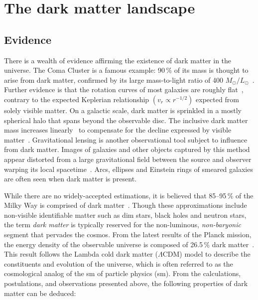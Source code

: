 \section{The dark matter landscape}
\label{sec:theory_dm_landscape}

\subsection{Evidence}
\label{subsec:theory_dm_evidence}

There is a wealth of evidence affirming the existence of dark matter in the universe. The Coma Cluster is a famous example: 90\,\% of its mass is thought to arise from dark matter, confirmed by its large mass-to-light ratio of 400 $M_{\odot} / L_{\odot}$~\cite{Yozin:2015mla}. Further evidence is that the rotation curves of most galaxies are roughly flat~\cite{1996MNRAS-281-27P}, contrary to the expected Keplerian relationship $(v_r \propto r^{-1/2})$ expected from solely visible matter. On a galactic scale, dark matter is sprinkled in a mostly spherical halo that spans beyond the observable disc. The inclusive dark matter mass increases linearly~\cite{2009arXiv0901.0632E} to compensate for the decline expressed by visible matter~\cite{1970ApJ-160-811F,1992AandA-256-19B}. Gravitational lensing is another observational tool subject to influence from dark matter. Images of galaxies and other objects captured by this method appear distorted from a large gravitational field between the source and observer warping its local spacetime~\cite{2010GReGr..42.2177H}. Arcs, ellipses and Einstein rings of smeared galaxies are often seen when dark matter is present.

While there are no widely-accepted estimations, it is believed that 85--95\,\% of the Milky Way is comprised of dark matter~\cite{2005MNRAS.364..433B,2006MNRAS.370.1055B,Kafle:2014xfa}. Though these approximations include non-visible identifiable matter such as dim stars, black holes and neutron stars, the term \emph{dark matter} is typically reserved for the non-luminous, \emph{non-baryonic} segment that pervades the cosmos. From the latest results of the Planck mission, the energy density of the observable universe is composed of 26.5\,\% dark matter~\cite{Aghanim:2018eyx}. This result follows the Lambda cold dark matter ($\Lambda\text{CDM}$) model to describe the constituents and evolution of the universe, which is often referred to as the cosmological analog of the \acrlong{sm} of particle physics (\acrshort{sm}). From the calculations, postulations, and observations presented above, the following properties of dark matter can be deduced:

